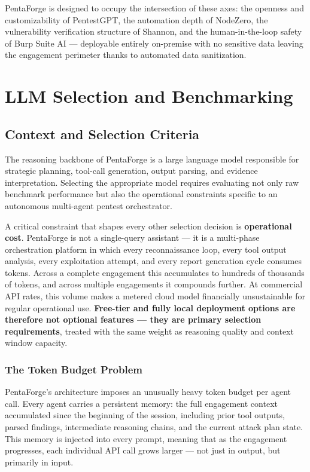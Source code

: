 \documentclass[12pt,a4paper]{report}
\begin{document}
PentaForge is designed to occupy the intersection of these axes: the openness
and customizability of PentestGPT, the automation depth of NodeZero, the
vulnerability verification structure of Shannon, and the human-in-the-loop safety
of Burp Suite AI --- deployable entirely on-premise with no sensitive data leaving
the engagement perimeter thanks to automated data sanitization.

\section{LLM Selection and Benchmarking}

\subsection{Context and Selection Criteria}

The reasoning backbone of PentaForge is a large language model responsible for
strategic planning, tool-call generation, output parsing, and evidence
interpretation. Selecting the appropriate model requires evaluating not only raw
benchmark performance but also the operational constraints specific to an
autonomous multi-agent pentest orchestrator.

A critical constraint that shapes every other selection decision is
\textbf{operational cost}. PentaForge is not a single-query assistant --- it is
a multi-phase orchestration platform in which every reconnaissance loop, every
tool output analysis, every exploitation attempt, and every report generation
cycle consumes tokens. Across a complete engagement this accumulates to hundreds
of thousands of tokens, and across multiple engagements it compounds further.
At commercial API rates, this volume makes a metered cloud model financially
unsustainable for regular operational use. \textbf{Free-tier and fully local
deployment options are therefore not optional features --- they are primary
selection requirements}, treated with the same weight as reasoning quality
and context window capacity.

\subsubsection{The Token Budget Problem}

PentaForge's architecture imposes an unusually heavy token budget per agent call.
Every agent carries a persistent memory: the full engagement context accumulated
since the beginning of the session, including prior tool outputs, parsed findings,
intermediate reasoning chains, and the current attack plan state. This memory is
injected into every prompt, meaning that as the engagement progresses, each
individual API call grows larger --- not just in output, but primarily in input.
\end{document}
